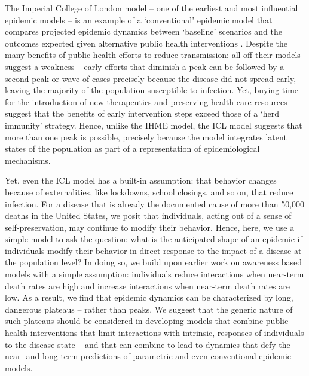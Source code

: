 The Imperial College of London model -- one of the earliest and most influential epidemic models -- is an example of a `conventional' epidemic model
that compares projected epidemic dynamics
between `baseline' scenarios and the outcomes expected
given alternative public health interventions \citep{ferguson2020report}. Despite the many
benefits of public health efforts to reduce transmission: all off their
models suggest a weakness -- early efforts that diminish a peak can be
followed by a second peak or wave of cases precisely because
the disease did not spread early, leaving the majority of the population
susceptible to infection. Yet, buying time for the introduction
of new therapeutics and preserving health care resources suggest
that the benefits of  early intervention steps exceed those of
a `herd immunity' strategy.  Hence, unlike the IHME model,
the ICL model suggests that more than one peak is possible,
precisely because the model integrates latent states of the population
as part of a representation of epidemiological mechanisms.

Yet, even the ICL model has a built-in assumption: that 
behavior changes because of externalities, like lockdowns,
school closings, and so on, that reduce infection.  For a disease
that is already the documented cause of more than 50,000 deaths
in the United States, we posit that individuals, acting
out of a sense of self-preservation, may continue to modify
their behavior.  Hence, here, we use a simple model to
ask the question: what is the anticipated
shape of an epidemic if individuals modify their behavior in direct
response to the impact of a disease at the population level? In doing so,
we build upon earlier work on awareness based models with a
simple assumption: individuals reduce interactions when near-term
death rates are high and increase interactions when near-term death
rates are low.  As a result, we find that epidemic dynamics
can be characterized by long, dangerous plateaus -- rather than peaks.
We suggest that the generic nature of such plateaus should
be considered in developing models that combine
public health interventions that limit interactions with
intrinsic, responses of individuals to the disease state -- and that
can combine to lead to dynamics that defy the near- and long-term
predictions of parametric and even conventional epidemic models.

